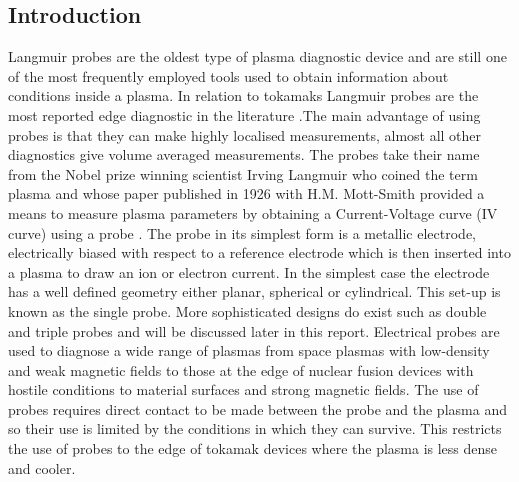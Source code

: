 \documentclass[12pt]{article}
\begin{document}
\subsection{Introduction}
Langmuir probes are the oldest type of plasma diagnostic device and are still one of the most frequently employed tools used to obtain information about conditions inside a plasma. In relation to tokamaks Langmuir probes are the most reported edge diagnostic in the literature \cite{matthews}.The main advantage of using probes is that they can make highly localised measurements, almost all other diagnostics give volume averaged measurements. The probes take their name from the Nobel prize winning scientist Irving Langmuir who coined the term plasma and whose paper published in 1926 with H.M. Mott-Smith provided a means to measure plasma parameters by obtaining a Current-Voltage curve (IV curve) using a probe \cite{mottsmith}. The probe in its simplest form is a metallic electrode, electrically biased with respect to a reference electrode which is then inserted into a plasma to draw an ion or electron current. In the simplest case the electrode has a well defined geometry either planar, spherical or cylindrical. This set-up is known as the single probe. More sophisticated  designs do exist such as double and triple probes and will be discussed later in this report. Electrical probes are used to diagnose a wide range of plasmas from space plasmas with low-density and weak magnetic fields to those at the edge of nuclear fusion devices with hostile conditions to material surfaces and strong magnetic fields. The use of probes requires direct contact to be made between the probe and the plasma and so their use is limited by the conditions in which they can survive. This restricts the use of probes to the edge of tokamak devices where the plasma is less dense and cooler. 
\end{document}
